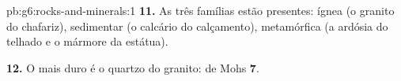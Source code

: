\begin{solution}{pb:g6:rocks-and-minerals:1}
\textbf{11.} As três famílias estão presentes: ígnea (o granito do
chafariz), sedimentar (o calcário do calçamento), metamórfica (a ardósia
do telhado e o mármore da estátua).

\textbf{12.} O  mais duro é o quartzo do granito:  de Mohs
\textbf{7}.
\end{solution}
